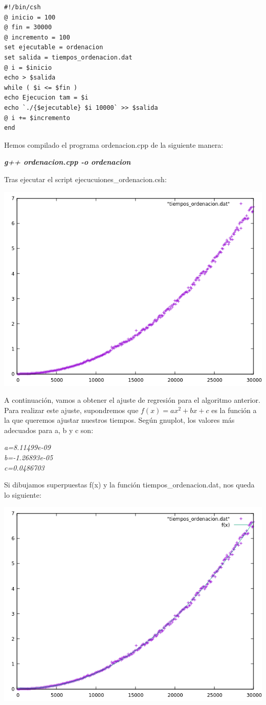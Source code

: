 \documentclass[a4paper,11pt]{article}
\begin{document}
\lstset{language=Bash, breaklines=true, basicstyle=\footnotesize}
\begin{lstlisting}[frame=single]
#!/bin/csh
@ inicio = 100
@ fin = 30000
@ incremento = 100
set ejecutable = ordenacion
set salida = tiempos_ordenacion.dat
@ i = $inicio
echo > $salida
while ( $i <= $fin )
echo Ejecucion tam = $i
echo `./{$ejecutable} $i 10000` >> $salida
@ i += $incremento
end
\end{lstlisting}
Hemos compilado el programa ordenacion.cpp de la siguiente manera:
\begin{center}
{\bf \it g++ ordenacion.cpp -o ordenacion}
\end{center}
Tras ejecutar el script ejecucuiones\_ordenacion.csh: 
\begin{center}
\includegraphics[scale=0.5]{1}
\end{center}
A continuación, vamos a obtener el ajuste de regresión para el algoritmo anterior. Para realizar este ajuste, supondremos que $f(x)=ax^2+bx+c$ es la función a la que queremos ajustar nuestros tiempos. Según gnuplot, los valores más adecuados para a, b y c son:
\begin{center}
{\it a=8.11499e-09 \\ b=-1.26893e-05 \\ c=0.0486703}
\end{center}
Si dibujamos superpuestas f(x) y la función tiempos\_ordenacion.dat, nos queda lo siguiente:
\begin{center}
\includegraphics[scale=0.5]{2}
\end{center}


\nocite{*}
\end{document}
